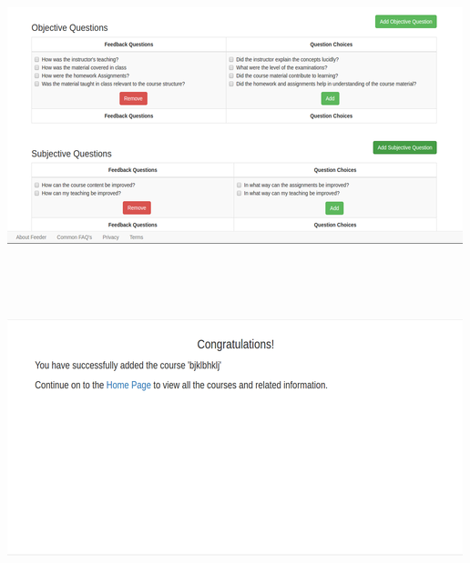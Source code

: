 \documentclass[11pt]{report}
\begin{document}
\begin{outline}
\begin{outline}
\newpage
\includegraphics{add_feedback}   \\ \\ \\ \\ \\
\includegraphics{congrats} 


\end{outline}
\end{outline}
\end{document}
